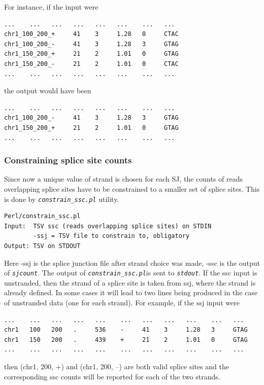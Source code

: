 \documentclass{article}
\newcommand{\prog}[1]{{\tt\em #1}}
\begin{document}
For instance, if the input were
\begin{verbatim}
...    ...   ...   ...   ...   ...    ...   ...
chr1_100_200_+     41    3     1.28   0     CTAC
chr1_100_200_-     41    3     1.28   3     GTAG
chr1_150_200_+     21    2     1.01   0     GTAG
chr1_150_200_-     21    2     1.01   0     CTAC
...    ...   ...   ...   ...   ...    ...   ...
\end{verbatim}
the output would have been 
\begin{verbatim}
...    ...   ...   ...   ...   ...    ...   ...
chr1_100_200_-     41    3     1.28   3     GTAG
chr1_150_200_+     21    2     1.01   0     GTAG
...    ...   ...   ...   ...   ...    ...   ...
\end{verbatim}


\subsubsection{Constraining splice site counts}
Since now a unique value of strand is chosen for each SJ, the counts of reads overlapping splice sites have to be constrained to a smaller set of splice sites.
This is done by \prog{constrain\_ssc.pl} utility.
\begin{verbatim}
Perl/constrain_ssc.pl
Input:  TSV ssc (reads overlapping splice sites) on STDIN
        -ssj = TSV file to constrain to, obligatory
Output: TSV on STDOUT
\end{verbatim}
Here -ssj is the splice junction file after strand choice was made, -ssc is the output of \prog{sjcount}. The output of \prog{constrain\_ssc.pl}is sent to \prog{stdout}. 
If the ssc input is unstranded, then the strand of a splice site is taken from ssj, where the strand is already defined. In some cases it will lead to two 
lines being produced in the case of unstranded data (one for each strand). For example, if the ssj input were
\begin{verbatim}
...    ...   ...   ...   ...    ...   ...   ...   ...    ...   ...
chr1   100   200   .     536    -     41    3     1.28   3     GTAG
chr1   150   200   .     439    +     21    2     1.01   0     GTAG
...    ...   ...   ...   ...    ...   ...   ...   ...    ...   ...
\end{verbatim}
then (chr1, 200, +) and (chr1, 200, --) are both valid splice sites and the corresponding ssc counts will be reported for each of the two strands.
\end{document}

